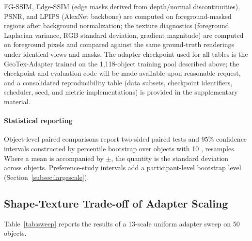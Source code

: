 \documentclass[times,twocolumn,final]{elsarticle}
\providecommand{\DIFadd}[1]{{\protect\color{blue} \sf #1}} %
\providecommand{\DIFaddend}{} %
\DeclareRobustCommand{\DIFaddend}{\DIFOaddend \let\includegraphics\DIFOincludegraphics} %
\begin{document}
\DIFadd{FG-SSIM, Edge-SSIM (edge masks derived from depth/normal discontinuities), PSNR, and LPIPS (AlexNet backbone) are computed on foreground-masked regions after background normalization; the texture diagnostics (foreground Laplacian variance, RGB standard deviation, gradient magnitude) are computed on foreground pixels and compared against the same ground-truth renderings under identical views and masks. The adapter checkpoint used for all tables is the GeoTex-Adapter trained on the 1,118-object training pool described above; the checkpoint and evaluation code will be made available upon reasonable request, and a consolidated reproducibility table (data subsets, checkpoint identifiers, scheduler, seed, and metric implementations) is provided in the supplementary material.
}

\paragraph{\DIFadd{Statistical reporting}}
\DIFadd{Object-level paired comparisons report two-sided paired tests and 95\% confidence intervals constructed by percentile bootstrap over objects with 10}{\DIFadd{,}}\DIFadd{000 resamples. Where a mean is accompanied by $\pm$, the quantity is the standard deviation across objects. Preference-study intervals add a participant-level bootstrap level (Section~\ref{subsec:largescale})}\DIFaddend .

\subsection{Shape-Texture Trade-off of Adapter Scaling}
\label{subsec:tradeoff}

Table~\ref{tab:sweep} reports the results of a 13-scale uniform adapter sweep on 50 objects.
\end{document}
